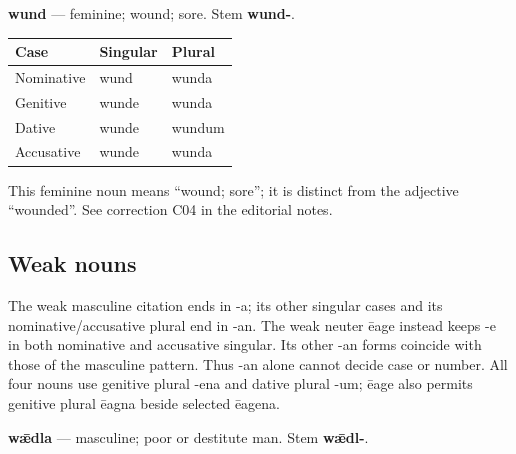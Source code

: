 \textbf{wund} — feminine; wound; sore. Stem \textbf{wund-}.

\par\begingroup
\fontsize{10.5}{13.2}\selectfont
\setlength{\LTleft}{0pt}\setlength{\LTright}{\fill}
\noindent
\begin{tabular}{@{}>{\raggedright\arraybackslash}p{39.46mm}>{\raggedright\arraybackslash}p{39.46mm}>{\raggedright\arraybackslash}p{39.46mm}@{}}
\toprule
\textbf{Case} & \textbf{Singular} & \textbf{Plural} \\
\midrule
Nominative & wund & wunda \\
Genitive & wunde & wunda \\
Dative & wunde & wundum \\
Accusative & wunde & wunda \\
\bottomrule
\end{tabular}
\par\endgroup

This feminine noun means “wound; sore”; it is distinct from the adjective “wounded”. See correction C04 in the editorial notes.

\subsection*{Weak nouns}

The weak masculine citation ends in -a; its other singular cases and its nominative/\allowbreak{}accusative plural end in -an. The weak neuter ēage instead keeps -e in both nominative and accusative singular. Its other -an forms coincide with those of the masculine pattern. Thus -an alone cannot decide case or number. All four nouns use genitive plural -ena and dative plural -um; ēage also permits genitive plural ēagna beside selected ēagena.

\textbf{wǣdla} — masculine; poor or destitute man. Stem \textbf{wǣdl-}.

